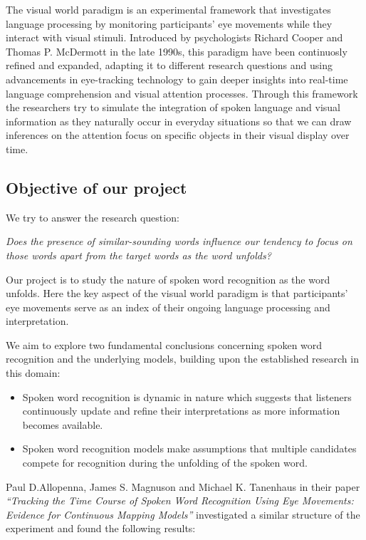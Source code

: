 \documentclass[
  a4paper,
]{article}
\providecommand{\tightlist}{%
  \setlength{\itemsep}{0pt}\setlength{\parskip}{0pt}}\usepackage{longtable,booktabs,array}
\begin{document}
The visual world paradigm is an experimental framework that investigates
language processing by monitoring participants' eye movements while they
interact with visual stimuli. Introduced by psychologists Richard Cooper
and Thomas P. McDermott in the late 1990s, this paradigm have been
continuosly refined and expanded, adapting it to different research
questions and using advancements in eye-tracking technology to gain
deeper insights into real-time language comprehension and visual
attention processes. Through this framework the researchers try to
simulate the integration of spoken language and visual information as
they naturally occur in everyday situations so that we can draw
inferences on the attention focus on specific objects in their visual
display over time.

\hypertarget{objective-of-our-project}{%
\subsection{Objective of our project}\label{objective-of-our-project}}

We try to answer the research question:

\emph{Does the presence of similar-sounding words influence our tendency
to focus on those words apart from the target words as the word
unfolds?}

Our project is to study the nature of spoken word recognition as the
word unfolds. Here the key aspect of the visual world paradigm is that
participants' eye movements serve as an index of their ongoing language
processing and interpretation.

We aim to explore two fundamental conclusions concerning spoken word
recognition and the underlying models, building upon the established
research in this domain:

\begin{itemize}
\tightlist
\item
  Spoken word recognition is dynamic in nature which suggests that
  listeners continuously update and refine their interpretations as more
  information becomes available.
\item
  Spoken word recognition models make assumptions that multiple
  candidates compete for recognition during the unfolding of the spoken
  word.
\end{itemize}

Paul D.Allopenna, James S. Magnuson and Michael K. Tanenhaus in their
paper \emph{``Tracking the Time Course of Spoken Word Recognition Using
Eye Movements: Evidence for Continuous Mapping Models''} investigated a
similar structure of the experiment and found the following results:
\end{document}
